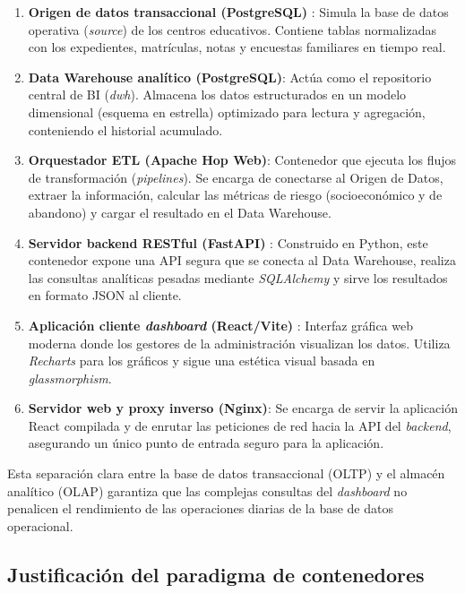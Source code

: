 \begin{enumerate}
    \item \textbf{Origen de datos transaccional (PostgreSQL)} \cite{PostgreSQL_Docs}: Simula la base de datos operativa (\textit{source}) de los centros educativos. Contiene tablas normalizadas con los expedientes, matrículas, notas y encuestas familiares en tiempo real.
    \item \textbf{Data Warehouse analítico (PostgreSQL)}: Actúa como el repositorio central de BI (\textit{dwh}). Almacena los datos estructurados en un modelo dimensional (esquema en estrella) optimizado para lectura y agregación, conteniendo el historial acumulado.
    \item \textbf{Orquestador ETL (Apache Hop Web)}: Contenedor que ejecuta los flujos de transformación (\textit{\textit{pipeline}s}). Se encarga de conectarse al Origen de Datos, extraer la información, calcular las métricas de riesgo (socioeconómico y de abandono) y cargar el resultado en el Data Warehouse.
    \item \textbf{Servidor backend RESTful (FastAPI)} \cite{FastAPI_Docs}: Construido en Python, este contenedor expone una API segura que se conecta al Data Warehouse, realiza las consultas analíticas pesadas mediante \textit{SQLAlchemy} y sirve los resultados en formato JSON al cliente.
    \item \textbf{Aplicación cliente \textit{dashboard} (React/Vite)} \cite{React_Docs}: Interfaz gráfica web moderna donde los gestores de la administración visualizan los datos. Utiliza \textit{Recharts} para los gráficos y sigue una estética visual basada en \textit{glassmorphism}.
    \item \textbf{Servidor web y proxy inverso (Nginx)}: Se encarga de servir la aplicación React compilada y de enrutar las peticiones de red hacia la API del \textit{backend}, asegurando un único punto de entrada seguro para la aplicación.
\end{enumerate}

Esta separación clara entre la base de datos transaccional (OLTP) y el almacén analítico (OLAP) garantiza que las complejas consultas del \textit{dashboard} no penalicen el rendimiento de las operaciones diarias de la base de datos operacional.

\subsection{Justificación del paradigma de contenedores}

